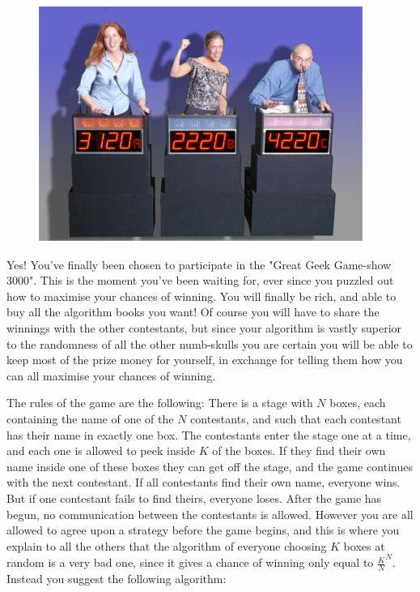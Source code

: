 
\begin{figure}
\vspace{-5mm}
\includegraphics[width=\linewidth,keepaspectratio=true]{gameshow/gameshow}
\vspace{-9mm}
\end{figure}

\noindent
Yes! You've finally been chosen to participate in the "Great Geek Game-show 3000". This is the moment you've been waiting for, ever since you puzzled out how to maximise your chances of winning. You will finally be rich, and able to buy all the algorithm books you want! Of course you will have to share the winnings with the other contestants, but since your algorithm is vastly superior to the randomness of all the other numb-skulls you are certain you will be able to keep most of the prize money for yourself, in exchange for telling them how you can all maximise your chances of winning.

The rules of the game are the following: There is a stage with $N$ boxes, each containing the name of one of the $N$ contestants, and such that each contestant has their name in exactly one box. The contestants enter the stage one at a time, and each one is allowed to peek inside $K$ of the boxes. If they find their own name inside one of these boxes they can get off the stage, and the game continues with the next contestant. If all contestants find their own name, everyone wins. But if one contestant fails to find theirs, everyone loses. After the game has begun, no communication between the contestants is allowed. 
However you are all allowed to agree upon a strategy before the game begins, and this is where you explain to all the others that the algorithm of everyone choosing $K$ boxes at random is a very bad one, since it gives a chance of winning only equal to ${\frac{K}{N}}^N$. Instead you suggest the following algorithm:

